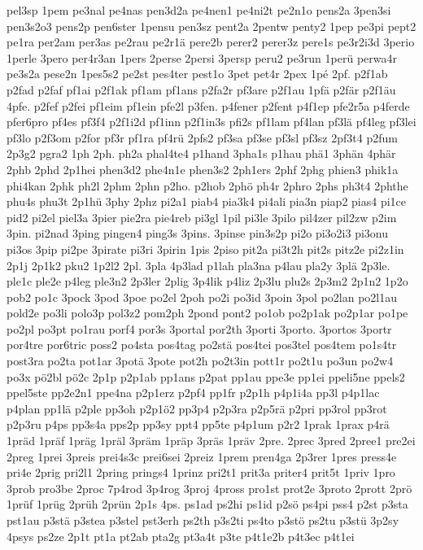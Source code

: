 {pel3sp
1pem
pe3nal
pe4nas
pen3d2a
pe4nen1
pe4ni2t
pe2n1o
pens2a
3pen3si
pen3s2o3
pens2p
pen6ster
1pensu
pen3sz
pent2a
2pentw
penty2
1pep
pe3pi
pept2
pe1ra
per2am
per3as
pe2rau
pe2r1ä
pere2b
perer2
perer3z
pere1s
pe3r2i3d
3perio
1perle
3pero
per4r3an
1pers
2perse
2persi
3persp
peru2
pe3run
1perü
perwa4r
pe3s2a
pese2n
1pes5s2
pe2st
pes4ter
pest1o
3pet
pet4r
2pex
1pé
2pf.
p2f1ab
p2fad
p2faf
pf1ai
p2f1ak
pf1am
pf1ans
p2fa2r
pf3are
p2f1au
1pfä
p2fär
p2f1äu
4pfe.
p2fef
p2fei
pf1eim
pf1ein
pfe2l
p3fen.
p4fener
p2fent
p4f1ep
pfe2r5a
p4ferde
pfer6pro
pf4es
pf3f4
p2f1i2d
pf1inn
p2f1in3s
pfi2s
pf1lam
pf4lan
pf3lä
pf4leg
pf3lei
pf3lo
p2f3om
p2for
pf3r
pf1ra
pf4rü
2pfs2
pf3sa
pf3se
pf3sl
pf3sz
2pf3t4
p2fum
2p3g2
pgra2
1ph
2ph.
ph2a
phal4te4
p1hand
3pha1s
p1hau
phä1
3phän
4phär
2phb
2phd
2p1hei
phen3d2
phe4n1e
phen3s2
2ph1ers
2phf
2phg
phien3
phik1a
phi4kan
2phk
ph2l
2phm
2phn
p2ho.
p2hob
2phö
ph4r
2phro
2phs
ph3t4
2phthe
phu4s
phu3t
2p1hü
3phy
2phz
pi2a1
piab4
pia3k4
pi4ali
pia3n
piap2
pias4
pi1ce
pid2
pi2el
piel3a
3pier
pie2ra
pie4reb
pi3gl
1pil
pi3le
3pilo
pil4zer
pil2zw
p2im
3pin.
pi2nad
3ping
pingen4
ping3s
3pins.
3pinse
pin3s2p
pi2o
pi3o2i3
pi3onu
pi3os
3pip
pi2pe
3pirate
pi3ri
3pirin
1pis
2piso
pit2a
pi3t2h
pit2s
pitz2e
pi2z1in
2p1j
2p1k2
pku2
1p2l2
2pl.
3pla
4p3lad
p1lah
pla3na
p4lau
pla2y
3plä
2p3le.
ple1c
ple2e
p4leg
ple3n2
2p3ler
2plig
3p4lik
p4liz
2p3lu
plu2s
2p3m2
2p1n2
1p2o
pob2
po1c
3pock
3pod
3poe
po2el
2poh
po2i
po3id
3poin
3pol
po2lan
po2l1au
pold2e
po3li
polo3p
pol3z2
pom2ph
2pond
pont2
po1ob
po2p1ak
po2p1ar
po1pe
po2pl
po3pt
po1rau
porf4
por3s
3portal
por2th
3porti
3porto.
3portos
3portr
por4tre
por6tric
poss2
po4sta
pos4tag
po2stä
pos4tei
pos3tel
pos4tem
po1s4tr
post3ra
po2ta
pot1ar
3potä
3pote
pot2h
po2t3in
pott1r
po2t1u
po3un
po2w4
po3x
pö2bl
pö2c
2p1p
p2p1ab
pp1ans
p2pat
pp1au
ppe3e
pp1ei
ppeli5ne
ppels2
ppel5ste
pp2e2n1
ppe4na
p2p1erz
p2pf4
pp1fr
p2p1h
p4p1i4a
pp3l
p4p1lac
p4plan
pp1lä
p2ple
pp3oh
p2p1ö2
pp3p4
p2p3ra
p2p5rä
p2pri
pp3rol
pp3rot
p2p3ru
p4ps
pp3s4a
pps2p
pp3sy
ppt4
pp5te
p4p1um
p2r2
1prak
1prax
p4rä
1präd
1präf
1präg
1präl
3präm
1präp
3präs
1präv
2pre.
2prec
3pred
2pree1
pre2ei
2preg
1prei
3preis
prei4s3c
prei6sei
2preiz
1prem
pren4ga
2p3rer
1pres
press4e
pri4e
2prig
pri2l1
2pring
prings4
1prinz
pri2t1
prit3a
priter4
prit5t
1priv
1pro
3prob
pro3be
2proc
7p4rod
3p4rog
3proj
4pross
pro1st
prot2e
3proto
2prott
2prö
1prüf
1prüg
2prüh
2prün
2p1s
4ps.
ps1ad
ps2hi
ps1id
p2sö
ps4pi
pss4
p2st
p3sta
pst1au
p3stä
p3stea
p3stel
pst3erh
ps2th
p3s2ti
ps4to
p3stö
ps2tu
p3stü
3p2sy
4psys
ps2ze
2p1t
pt1a
pt2ab
pta2g
pt3a4t
p3te
p4t1e2b
p4t3ec
p4t1ei
}
